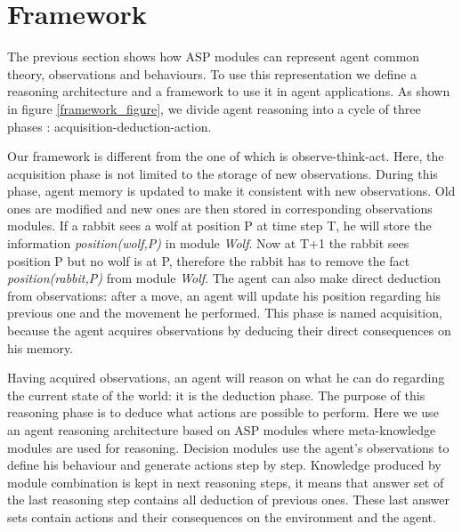 \documentclass{aamas2012}
\begin{document}
\section{Framework}

	The previous section shows how ASP modules can represent agent common theory, observations and behaviours.
	To use this representation we define a reasoning architecture and a framework to use it in agent applications.
	As shown in figure \ref{framework_figure}, we divide agent reasoning into a cycle of three phases : acquisition-deduction-action.
	
	Our framework is different from the one of \cite{DBLP:journals/amai/KowalskiS99} which is observe-think-act.
	Here, the acquisition phase is not limited to the storage of new observations.
	During this phase, agent memory is updated to make it consistent with new observations.
	Old ones are modified and new ones are then stored in corresponding observations modules.
	If a rabbit sees a wolf at position P at time step T, he will store the information \emph{position(wolf,P)} in module \emph{Wolf}.
	Now at T+1 the rabbit sees position P but no wolf is at P, therefore the rabbit has to remove the fact \emph{position(rabbit,P)} from module \emph{Wolf}.
	The agent can also make direct deduction from observations: after a move, an agent will update his position regarding his previous one and the movement he performed.
	This phase is named acquisition, because the agent acquires observations by deducing their direct consequences on his memory.
	
	Having acquired observations, an agent will reason on what he can do regarding the current state of the world: it is the deduction phase.
	The purpose of this reasoning phase is to deduce what actions are possible to perform.
	Here we use an agent reasoning architecture based on ASP modules where meta-knowledge modules are used for reasoning.
	Decision modules use the agent's observations to define his behaviour and generate actions step by step.
	Knowledge produced by module combination is kept in next reasoning steps, 
	it means that answer set of the last reasoning step contains all deduction of previous ones.
	These last answer sets contain actions and their consequences on the environment and the agent.
	
\end{document}
